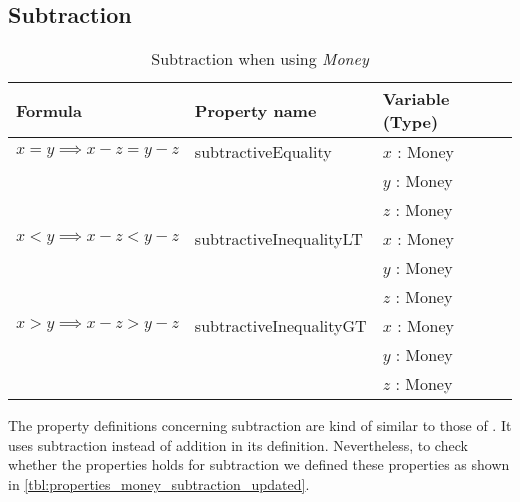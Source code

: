 \subsection*{Subtraction}
\label{ssct:properties_subtraction_updated}
\begin{table}[!ht]
\centering
\begin{tabular}{lll}
\hline
                        \textbf{Formula}                         & \textbf{Property name}  & \textbf{Variable (Type)} \\ \hline
\rowcolor[HTML]{EFEFEF} $x = y \implies x - z = y - z$ & subtractiveEquality     & $x$ : Money              \\
\rowcolor[HTML]{EFEFEF}                                          &                         & $y$ : Money              \\
\rowcolor[HTML]{EFEFEF}                                          &                         & $z$ : Money              \\
                        $x < y \implies x - z < y - z$           & subtractiveInequalityLT & $x$ : Money              \\
                                                                 &                         & $y$ : Money              \\
                                                                 &                         & $z$ : Money              \\
\rowcolor[HTML]{EFEFEF} $x > y \implies x - z > y - z$           & subtractiveInequalityGT & $x$ : Money              \\
\rowcolor[HTML]{EFEFEF}                                          &                         & $y$ : Money              \\
\rowcolor[HTML]{EFEFEF}                                          &                         & $z$ : Money              \\ \hline
\end{tabular}
\caption{Subtraction when using \textit{Money}}
\label{tbl:properties_money_subtraction_updated}
\end{table}
\FloatBarrier\noindent
The property definitions concerning subtraction are kind of similar to those of
. It uses subtraction instead of
addition in its definition. Nevertheless, to check whether the properties holds
for subtraction we defined these properties as shown in
\autoref{tbl:properties_money_subtraction_updated}.
\clearpage %
